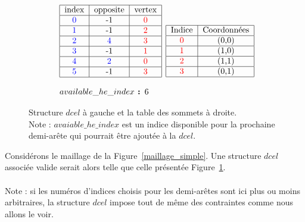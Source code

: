 \documentclass[]{article}
\begin{document}
\begin{multicols}{2}
	\begin{figure}[H]
		\[
		\begin{aligned}[c]
			\begin{array}{l}
				\begin{tabular}{|c|c|c|c|}
					\hline
					index & opposite & vertex \\
					\hline
					\color{blue}0 & -1 & \color{red}0 \\
					\hline
					\color{blue}1 & -1 & \color{red}2 \\
					\hline
					\color{blue}2 & \color{blue}4 & \color{red}3 \\
					\hline
					\color{blue}3 & -1 & \color{red}1 \\
					\hline
					\color{blue}4 & \color{blue}2 & \color{red}0 \\
					\hline
					\color{blue}5 & -1 & \color{red}3 \\
					\hline
				\end{tabular}\\\\
				available\_he\_index\textbf{ : }6
			\end{array}
		\end{aligned}
		\begin{aligned}[c]
			\begin{tabular}{|c|c|}
				\hline
				Indice & Coordonnées \\
				\hline
				\color{red}0 & (0,0) \\
				\hline
				\color{red}1 & (1,0) \\
				\hline
				\color{red}2 & (1,1) \\
				\hline
				\color{red}3 & (0,1) \\
				\hline
			\end{tabular}
		\end{aligned}
		\]
		\caption{Structure $dcel$ à gauche et la table des sommets à droite.\\Note : $avaiable\_he\_index$ est un indice disponible pour la prochaine demi-arête qui pourrait être ajoutée à la $dcel$.}
		\label{maillage_simple_struct_associee}
	\end{figure}

	Considérons le maillage de la Figure~\ref{maillage_simple}. Une structure $dcel$ associée valide serait alors telle que celle présentée Figure~\ref{maillage_simple_struct_associee}.\\\\
	Note : si les numéros d'indices choisis pour les demi-arêtes sont ici plus ou moins arbitraires, la structure $dcel$ impose tout de même des contraintes comme nous allons le voir.
	

\end{multicols}
\end{document}

